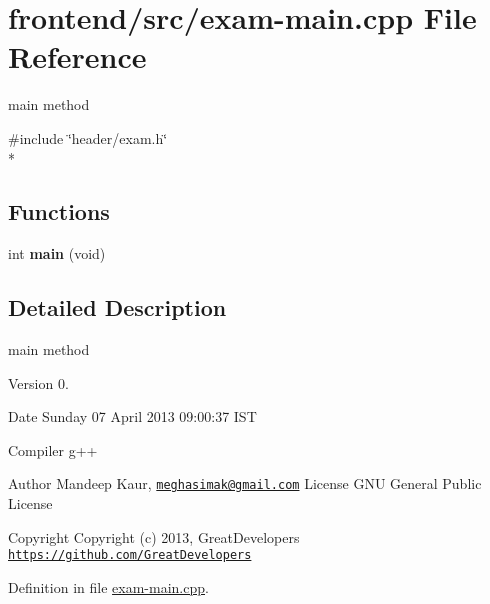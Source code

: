 \hypertarget{exam-main_8cpp}{\section{frontend/src/exam-\/main.cpp File Reference}
\label{exam-main_8cpp}
}


main method  


{\ttfamily \#include \char`\"{}header/exam.\-h\char`\"{}}\\*
\subsection*{Functions}
\begin{DoxyCompactItemize}
\item 
\hypertarget{exam-main_8cpp_a840291bc02cba5474a4cb46a9b9566fe}{int {\bfseries main} (void)}\label{exam-main_8cpp_a840291bc02cba5474a4cb46a9b9566fe}

\end{DoxyCompactItemize}


\subsection{Detailed Description}
main method \begin{DoxyVersion}{Version}
0. 
\end{DoxyVersion}
\begin{DoxyDate}{Date}
Sunday 07 April 2013 09\-:00\-:37 I\-S\-T\par
 Compiler g++
\end{DoxyDate}
\begin{DoxyAuthor}{Author}
Mandeep Kaur, \href{mailto:meghasimak@gmail.com}{\tt meghasimak@gmail.\-com} License G\-N\-U General Public License 
\end{DoxyAuthor}
\begin{DoxyCopyright}{Copyright}
Copyright (c) 2013, Great\-Developers \href{https://github.com/GreatDevelopers}{\tt https\-://github.\-com/\-Great\-Developers} 
\end{DoxyCopyright}


Definition in file \hyperlink{exam-main_8cpp_source}{exam-\/main.\-cpp}.


